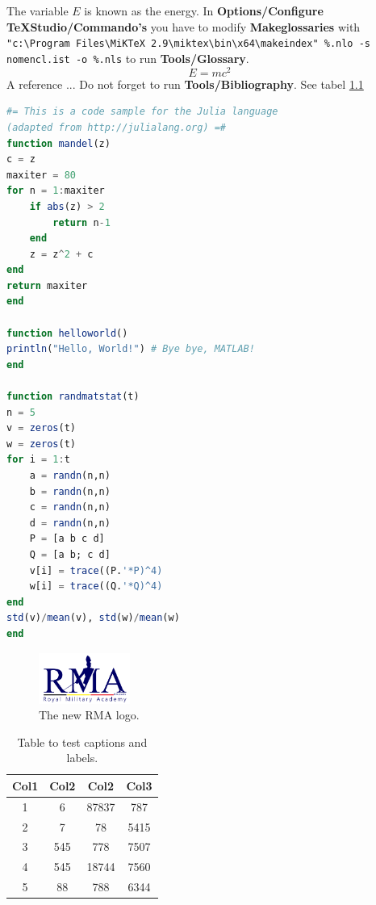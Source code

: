 \chapter{}
The variable $E$ is known as the energy. In \textbf{Options/Configure TeXStudio/Commando's} you have to modify \textbf{Makeglossaries} with \texttt{"c:\textbackslash Program Files\textbackslash MiKTeX 2.9\textbackslash miktex\textbackslash bin\textbackslash x64\textbackslash makeindex" \%.nlo -s nomencl.ist -o \%.nls} to run \textbf{Tools/Glossary}.
\begin{equation}
	E = mc^2
\end{equation}
A reference \cite{lauwens2010performance} ... Do not forget to run \textbf{Tools/Bibliography}.
See tabel \ref{tabletest}
\begin{lstlisting}[language=julia]
#= This is a code sample for the Julia language
(adapted from http://julialang.org) =#
function mandel(z)
c = z
maxiter = 80
for n = 1:maxiter
	if abs(z) > 2
		return n-1
	end
	z = z^2 + c
end
return maxiter
end

function helloworld()
println("Hello, World!") # Bye bye, MATLAB!
end

function randmatstat(t)
n = 5
v = zeros(t)
w = zeros(t)
for i = 1:t
	a = randn(n,n)
	b = randn(n,n)
	c = randn(n,n)
	d = randn(n,n)
	P = [a b c d]
	Q = [a b; c d]
	v[i] = trace((P.'*P)^4)
	w[i] = trace((Q.'*Q)^4)
end
std(v)/mean(v), std(w)/mean(w)
end
\end{lstlisting}
\begin{figure}
	\centering
	\includegraphics[width=3cm]{logo-rma}
	\caption{The new RMA logo.}
\end{figure}
\begin{table}
	\centering
	\begin{tabular}{||c c c c||} 
		\hline
		Col1 & Col2 & Col2 & Col3 \\ [0.5ex] 
		\hline\hline
		1 & 6 & 87837 & 787 \\ 
		2 & 7 & 78 & 5415 \\
		3 & 545 & 778 & 7507 \\
		4 & 545 & 18744 & 7560 \\
		5 & 88 & 788 & 6344 \\ [1ex] 
		\hline
	\end{tabular}
	\caption{Table to test captions and labels.}
	\label{tabletest}
\end{table}